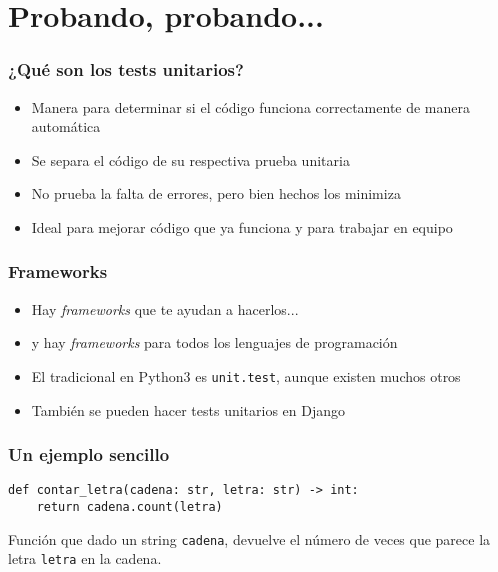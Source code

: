 \section{Probando, probando...}


\begin{frame}
\frametitle{¿Qué son los tests unitarios?}

\begin{itemize}
  \item Manera para determinar si el código funciona correctamente de manera automática
  \item Se separa el código de su respectiva prueba unitaria
  \item No prueba la falta de errores, pero bien hechos los minimiza
  \item Ideal para mejorar código que ya funciona y para trabajar en equipo
\end{itemize}

\end{frame}



\begin{frame}
\frametitle{Frameworks}

\begin{itemize}
\item Hay \emph{frameworks} que te ayudan a hacerlos...
\item y hay \emph{frameworks} para todos los lenguajes de programación
\item El tradicional en Python3 es \texttt{unit.test}, aunque existen muchos otros
\item También se pueden hacer tests unitarios en Django
\end{itemize}

\end{frame}



\begin{frame}[fragile]
\frametitle{Un ejemplo sencillo}

\begin{verbatim}
def contar_letra(cadena: str, letra: str) -> int:
    return cadena.count(letra)
\end{verbatim}

Función que dado un string \texttt{cadena}, devuelve el número de veces que
parece la letra \texttt{letra} en la cadena.

\end{frame}


